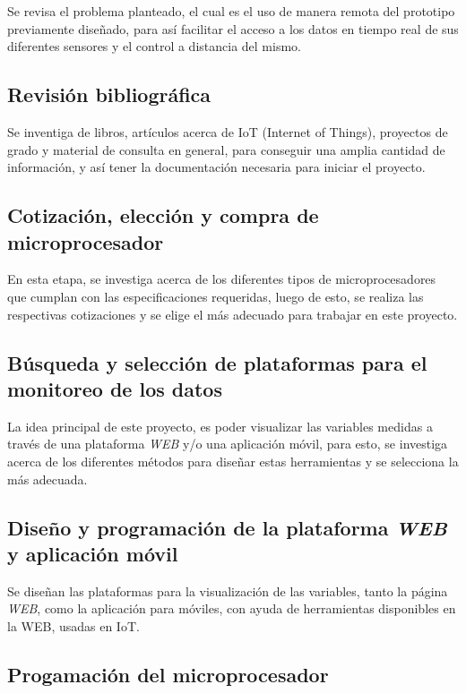 Se revisa el problema planteado, el cual es el uso de manera remota del prototipo previamente diseñado\cite{Paneles}\cite{Proto}, para así facilitar el acceso a los datos en tiempo real de sus diferentes sensores y el control a distancia del mismo.

\subsection{Revisión bibliográfica}

Se inventiga de libros, artículos acerca de IoT (Internet of Things), proyectos de grado y material de consulta en general, para conseguir una amplia cantidad de información, y así tener la documentación necesaria para iniciar el proyecto.

\subsection{Cotización, elección y compra de microprocesador}

En esta etapa, se investiga acerca de los diferentes tipos de microprocesadores que cumplan con las especificaciones requeridas, luego de esto, se realiza las respectivas cotizaciones y se elige el más adecuado para trabajar en este proyecto.

\subsection{Búsqueda y selección de plataformas para el monitoreo de los datos}

La idea principal de este proyecto, es poder visualizar las variables medidas a través de una plataforma \textit{WEB} y/o una aplicación móvil, para esto, se investiga acerca de los diferentes métodos para diseñar estas herramientas y se selecciona la más adecuada.

\subsection{Diseño y programación de la plataforma \textit{WEB} y aplicación móvil}

Se diseñan las plataformas para la visualización de las variables, tanto la página \textit{WEB}, como la aplicación para móviles, con ayuda de herramientas disponibles en la WEB, usadas en IoT.

\subsection{Progamación del microprocesador}

